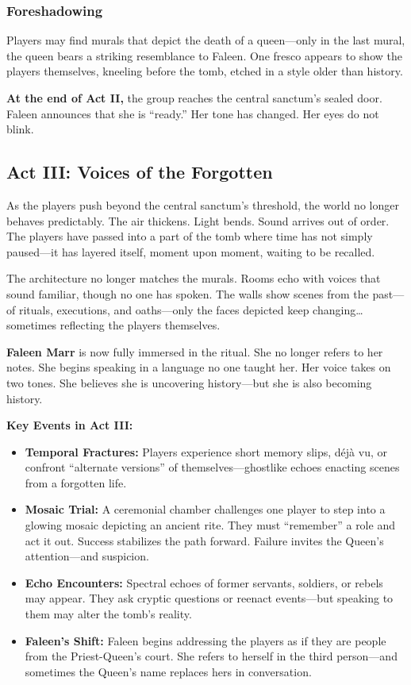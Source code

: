 \subsubsection{Foreshadowing}
Players may find murals that depict the death of a queen—only in the last mural, the queen bears a striking resemblance to Faleen. One fresco appears to show the players themselves, kneeling before the tomb, etched in a style older than history.

\textbf{At the end of Act II,} the group reaches the central sanctum’s sealed door. Faleen announces that she is “ready.” Her tone has changed. Her eyes do not blink.


\subsection{Act III: Voices of the Forgotten}

As the players push beyond the central sanctum’s threshold, the world no longer behaves predictably. The air thickens. Light bends. Sound arrives out of order. The players have passed into a part of the tomb where time has not simply paused—it has layered itself, moment upon moment, waiting to be recalled.

The architecture no longer matches the murals. Rooms echo with voices that sound familiar, though no one has spoken. The walls show scenes from the past—of rituals, executions, and oaths—only the faces depicted keep changing… sometimes reflecting the players themselves.

\textbf{Faleen Marr} is now fully immersed in the ritual. She no longer refers to her notes. She begins speaking in a language no one taught her. Her voice takes on two tones. She believes she is uncovering history—but she is also becoming history.

\vspace{0.5\baselineskip}
\textbf{Key Events in Act III:}

\begin{itemize}
    \item \textbf{Temporal Fractures:} Players experience short memory slips, déjà vu, or confront “alternate versions” of themselves—ghostlike echoes enacting scenes from a forgotten life.
    
    \item \textbf{Mosaic Trial:} A ceremonial chamber challenges one player to step into a glowing mosaic depicting an ancient rite. They must “remember” a role and act it out. Success stabilizes the path forward. Failure invites the Queen’s attention—and suspicion.
    
    \item \textbf{Echo Encounters:} Spectral echoes of former servants, soldiers, or rebels may appear. They ask cryptic questions or reenact events—but speaking to them may alter the tomb’s reality.
    
    \item \textbf{Faleen’s Shift:} Faleen begins addressing the players as if they are people from the Priest-Queen’s court. She refers to herself in the third person—and sometimes the Queen’s name replaces hers in conversation.
\end{itemize}


